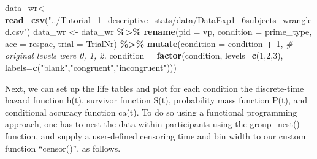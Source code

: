 \documentclass[
  man, donotrepeattitle,floatsintext]{apa6}
\newenvironment{Shaded}{\begin{snugshade}}{\end{snugshade}}
\newcommand{\AttributeTok}[1]{\textcolor[rgb]{0.13,0.29,0.53}{#1}}
\newcommand{\CommentTok}[1]{\textcolor[rgb]{0.56,0.35,0.01}{\textit{#1}}}
\newcommand{\DecValTok}[1]{\textcolor[rgb]{0.00,0.00,0.81}{#1}}
\newcommand{\FunctionTok}[1]{\textcolor[rgb]{0.13,0.29,0.53}{\textbf{#1}}}
\newcommand{\NormalTok}[1]{#1}
\newcommand{\OtherTok}[1]{\textcolor[rgb]{0.56,0.35,0.01}{#1}}
\newcommand{\SpecialCharTok}[1]{\textcolor[rgb]{0.81,0.36,0.00}{\textbf{#1}}}
\newcommand{\StringTok}[1]{\textcolor[rgb]{0.31,0.60,0.02}{#1}}
\begin{document}
\begin{Shaded}
\begin{Highlighting}[]
\NormalTok{data\_wr}\OtherTok{\textless{}{-}}\FunctionTok{read\_csv}\NormalTok{(}\StringTok{"../Tutorial\_1\_descriptive\_stats/data/DataExp1\_6subjects\_wrangled.csv"}\NormalTok{)}
\NormalTok{data\_wr }\OtherTok{\textless{}{-}}\NormalTok{ data\_wr }\SpecialCharTok{\%\textgreater{}\%} 
  \FunctionTok{rename}\NormalTok{(}\AttributeTok{pid =}\NormalTok{ vp, }\AttributeTok{condition =}\NormalTok{ prime\_type, }\AttributeTok{acc =}\NormalTok{ respac, }\AttributeTok{trial =}\NormalTok{ TrialNr) }\SpecialCharTok{\%\textgreater{}\%} 
  \FunctionTok{mutate}\NormalTok{(}\AttributeTok{condition =}\NormalTok{ condition }\SpecialCharTok{+} \DecValTok{1}\NormalTok{, }\CommentTok{\# original levels were 0, 1, 2.}
         \AttributeTok{condition =} \FunctionTok{factor}\NormalTok{(condition, }
                            \AttributeTok{levels=}\FunctionTok{c}\NormalTok{(}\DecValTok{1}\NormalTok{,}\DecValTok{2}\NormalTok{,}\DecValTok{3}\NormalTok{), }
                            \AttributeTok{labels=}\FunctionTok{c}\NormalTok{(}\StringTok{"blank"}\NormalTok{,}\StringTok{"congruent"}\NormalTok{,}\StringTok{"incongruent"}\NormalTok{)))}
\end{Highlighting}
\end{Shaded}

\normalsize

Next, we can set up the life tables and plot for each condition the discrete-time hazard function h(t), survivor function S(t), probability mass function P(t), and conditional accuracy function ca(t). To do so using a functional programming approach, one has to nest the data within participants using the group\_nest() function, and supply a user-defined censoring time and bin width to our custom function ``censor()'', as follows.

\footnotesize
\end{document}
